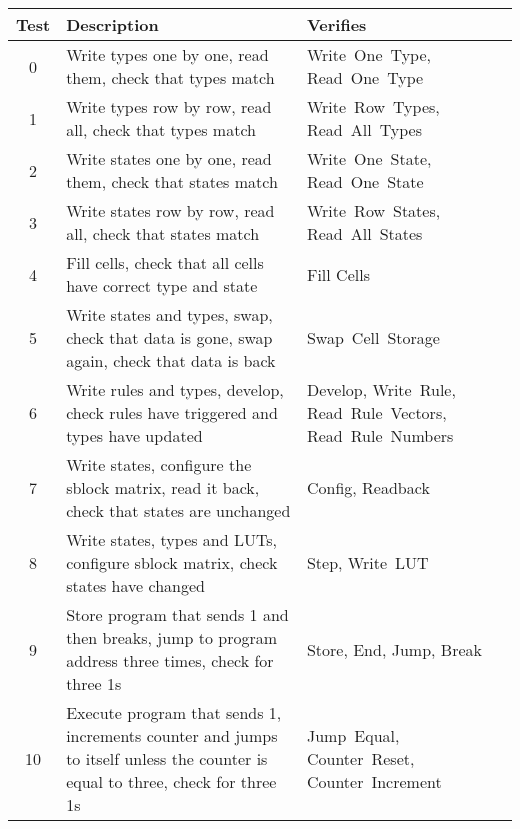 \begin{table}[!ht]
    \renewcommand{\arraystretch}{1.4}
    \centering
    \begin{tabularx}{\textwidth}{c|>{\raggedright\arraybackslash}X|>{\raggedright\arraybackslash}p{}}
        \bfseries Test & \bfseries Description & \bfseries Verifies \\
        \hline
        0 & Write types one by one, read them, check that types match & Write~One~Type, Read~One~Type \\
        1 & Write types row by row, read all, check that types match & Write~Row~Types, Read~All~Types \\
        2 & Write states one by one, read them, check that states match & Write~One~State, Read~One~State \\
        3 & Write states row by row, read all, check that states match & Write~Row~States, Read~All~States \\
        4 & Fill cells, check that all cells have correct type and state & Fill Cells \\
        5 & Write states and types, swap, check that data is gone, swap again, check that data is back & Swap~Cell~Storage \\
        6 & Write rules and types, develop, check rules have triggered and types have updated & Develop, Write~Rule, Read~Rule~Vectors, Read~Rule~Numbers \\
        7 & Write states, configure the sblock matrix, read it back, check that states are unchanged & Config, Readback \\
        8 & Write states, types and LUTs, configure sblock matrix, check states have changed & Step, Write~LUT \\
        9 & Store program that sends 1 and then breaks, jump to program address three times, check for three 1s & Store, End, Jump, Break \\
        10 & Execute program that sends 1, increments counter and jumps to itself unless the counter is equal to three, check for three 1s & Jump~Equal, Counter~Reset, Counter~Increment \\
    \end{tabularx}
\end{table}

